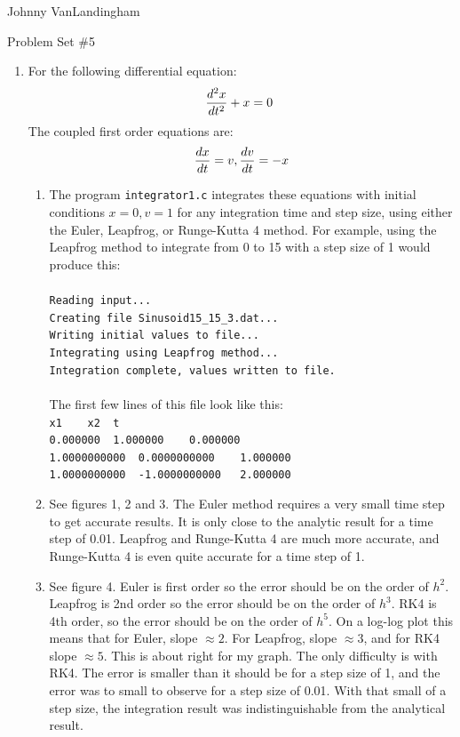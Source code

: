 \documentclass[11pt]{article}
\begin{document}
Johnny VanLandingham\\

\centerline{{\LARGE Problem Set \#5}}

\begin{enumerate}
\item For the following differential equation:
\begin{displaymath} \\
\frac{d^2x}{dt^2}+x=0\  
\end{displaymath}
The coupled first order equations are:
\begin{displaymath}
\frac{dx}{dt} = v,		\frac{dv}{dt} = -x\\
\end{displaymath}
\begin{enumerate}
\item The program \verb"integrator1.c" integrates these equations with initial conditions $x = 0, v = 1$ for any integration time and step size, using either the Euler, Leapfrog, or Runge-Kutta 4 method.  For example, using the Leapfrog method to integrate from 0 to 15 with a step size of 1 would produce this:\\
\\
\verb"Reading input..."\\
\verb"Creating file Sinusoid15_15_3.dat..."\\
\verb"Writing initial values to file..."\\
\verb"Integrating using Leapfrog method..."\\
\verb"Integration complete, values written to file."\\
\\
The first few lines of this file look like this:\\
\verb"x1	x2	t"\\
\verb"0.000000	1.000000	0.000000"\\
\verb"1.0000000000	0.0000000000	1.000000"\\
\verb"1.0000000000	-1.0000000000	2.000000"\\
\item See figures 1, 2 and 3.  The Euler method requires a very small time step to get accurate results.  It is only close to the analytic result for a time step of 0.01.  Leapfrog and Runge-Kutta 4 are much more accurate, and Runge-Kutta 4 is even quite accurate for a time step of 1.
\item See figure 4.  Euler is first order so the error should be on the order of $h^2$.  Leapfrog is 2nd order so the error should be on the order of $h^3$.  RK4 is 4th order, so the error should be on the order of $h^5$.  On a log-log plot this means that for Euler, slope $\approx 2$.  For Leapfrog, slope $\approx 3$, and for RK4 slope $\approx 5$.  This is about right for my graph.  The only difficulty is with RK4.  The error is smaller than it should be for a step size of 1, and the error was to small to observe for a step size of 0.01.  With that small of a step size, the integration result was indistinguishable from the analytical result.

\end{enumerate}
\end{enumerate}
\end{document}
